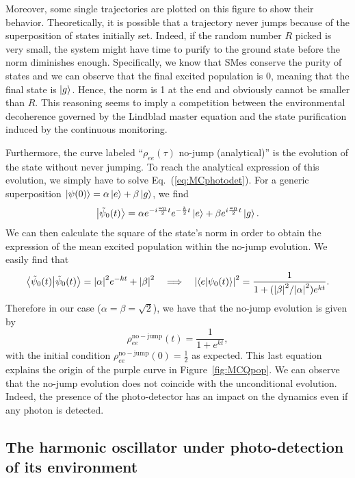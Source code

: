 Moreover, some single trajectories are plotted on this figure to show their behavior. Theoretically, it is possible that a trajectory never jumps because of the superposition of states initially set. Indeed, if the random number $R$ picked is very small, the system might have time to purify to the ground state before the norm diminishes enough. Specifically, we know that SMes conserve the purity of states and we can observe that the final excited population is 0, meaning that the final state is $\ket{g}$. Hence, the norm is 1 at the end and obviously cannot be smaller than $R$. This reasoning seems to imply a competition between the environmental decoherence governed by the Lindblad master equation and the state purification induced by the continuous monitoring.

Furthermore, the curve labeled ``$\rho_{ee}(\tau)$ no-jump (analytical)'' is the evolution of the state without never jumping. To reach the analytical expression of this evolution, we simply have to solve Eq.~(\ref{eq:MCphotodet}). For a generic superposition $\ket{\psi(0)}=\alpha\ket{e}+\beta\ket{g}$, we find
\begin{equation}
    \ket{\tilde{\psi}_0(t)} = \alpha e^{-i\frac{\omega_0}{2} t}e^{-\frac{k}{2} t}\ket{e} + \beta e^{i\frac{\omega_0}{2} t}\ket{g}.
\end{equation}
We can then calculate the square of the state's norm in order to obtain the expression of the mean excited population within the no-jump evolution. We easily find that
\begin{equation}
    \braket{\tilde{\psi}_0(t)} = \abs{\alpha}^2e^{-k t}+\abs{\beta}^2 \quad\Longrightarrow\quad \abs{\braket{e}{{\psi_0(t)}}}^2 = \frac{1}{1+(\abs{\beta}^2/\abs{\alpha}^2) e^{k t}}.
\end{equation}
Therefore in our case ($\alpha=\beta=\sqrt{2}$), we have that the no-jump evolution is given by
\begin{equation}
    \rho_{ee}^\mathrm{no-jump}(t) = \frac{1}{1+e^{k t}},
\end{equation}
with the initial condition $\rho_{ee}^\mathrm{no-jump}(0)=\frac{1}{2}$ as expected. This last equation explains the origin of the purple curve in Figure~\ref{fig:MCQpop}. We can observe that the no-jump evolution does not coincide with the unconditional evolution. Indeed, the presence of the photo-detector has an impact on the dynamics even if any photon is detected.  

\subsection{The harmonic oscillator under photo-detection of its environment}\label{sec:MCH}

